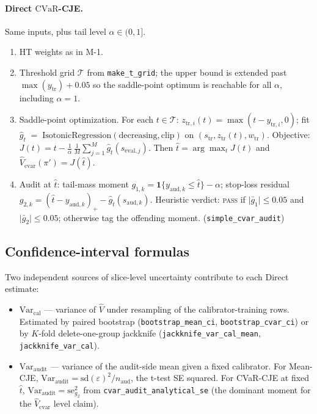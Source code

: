 \documentclass[11pt]{article}
\newcommand{\Var}{\mathrm{Var}}
\newcommand{\indicator}[1]{\mathbf{1}\{#1\}}
\newcommand{\CVaR}{\mathrm{CVaR}}
\begin{document}
\paragraph{Direct $\CVaR$-CJE.}
Same inputs, plus tail level $\alpha \in (0, 1]$.

\begin{enumerate}
\item[\textbf{C-1.}] HT weights as in M-1.
\item[\textbf{C-2.}] Threshold grid $\mathcal{T}$ from \texttt{make\_t\_grid}; the
  upper bound is extended past $\max(y_{\mathrm{tr}}) + 0.05$ so the saddle-point
  optimum is reachable for all $\alpha$, including $\alpha = 1$.
\item[\textbf{C-3.}] Saddle-point optimization. For each $t \in \mathcal{T}$:
  $z_{\mathrm{tr},i}(t) = \max(t - y_{\mathrm{tr},i}, 0)$; fit
  $\hat g_t \;=\; \mathrm{IsotonicRegression}(\text{decreasing}, \text{clip})$
  on $(s_{\mathrm{tr}}, z_{\mathrm{tr}}(t), w_{\mathrm{tr}})$.
  Objective: $J(t) = t - \tfrac{1}{\alpha}\, \tfrac{1}{M} \sum_{j=1}^{M} \hat g_t(s_{\mathrm{eval},j})$.
  Then $\hat t = \arg\max_t J(t)$ and $\widehat{V}_{\mathrm{cvar}}(\pi') = J(\hat t)$.
\item[\textbf{C-4.}] Audit at $\hat t$: tail-mass moment
  $g_{1,k} = \indicator{y_{\mathrm{aud},k} \le \hat t} - \alpha$;
  stop-loss residual $g_{2,k} = (\hat t - y_{\mathrm{aud},k})_+ - \hat g_{\hat t}(s_{\mathrm{aud},k})$.
  Heuristic verdict: \textsc{pass} if $\lvert \bar g_1 \rvert \le 0.05$ and
  $\lvert \bar g_2 \rvert \le 0.05$; otherwise tag the offending moment.
  (\texttt{simple\_cvar\_audit})
\end{enumerate}

\subsection{Confidence-interval formulas}
\label{app:ciformulas}

Two independent sources of slice-level uncertainty contribute to each
Direct estimate:

\begin{itemize}
\item $\Var_{\mathrm{cal}}$ — variance of $\widehat{V}$ under resampling
  of the calibrator-training rows. Estimated by paired bootstrap
  (\texttt{bootstrap\_mean\_ci}, \texttt{bootstrap\_cvar\_ci}) or by
  $K$-fold delete-one-group jackknife
  (\texttt{jackknife\_var\_cal\_mean}, \texttt{jackknife\_var\_cal}).
\item $\Var_{\mathrm{audit}}$ — variance of the audit-side mean given
  a fixed calibrator. For Mean-CJE, $\Var_{\mathrm{audit}} = \mathrm{sd}(\varepsilon)^2 / n_{\mathrm{aud}}$,
  the t-test SE squared. For CVaR-CJE at fixed $\hat t$,
  $\Var_{\mathrm{audit}} = \mathrm{se}_{g_2}^2$ from
  \texttt{cvar\_audit\_analytical\_se} (the dominant moment for the
  $\widehat{V}_{\mathrm{cvar}}$ level claim).
\end{itemize}
\end{document}
